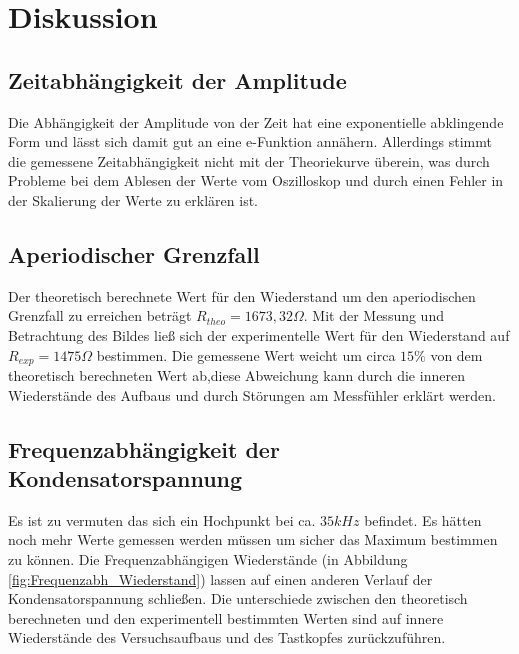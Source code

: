 \newpage
\section{Diskussion}
\label{sec:Diskussion}
\subsection{Zeitabhängigkeit der Amplitude}
Die Abhängigkeit der Amplitude von der Zeit hat eine exponentielle abklingende Form und lässt sich damit gut an eine e-Funktion annähern.
Allerdings stimmt die gemessene Zeitabhängigkeit nicht mit der Theoriekurve überein, was durch Probleme bei dem Ablesen der Werte vom Oszilloskop
und durch einen Fehler in der Skalierung der Werte zu erklären ist.
\subsection{Aperiodischer Grenzfall}
Der theoretisch berechnete Wert für den Wiederstand um den aperiodischen Grenzfall zu erreichen beträgt $R_{theo}=1673,32 \Omega$.
Mit der Messung und Betrachtung des Bildes ließ sich der experimentelle Wert für den Wiederstand auf $R_{exp} = 1475\Omega$ bestimmen.
Die gemessene Wert weicht um circa $15\%$ von dem theoretisch berechneten Wert ab,diese Abweichung kann durch die inneren Wiederstände des Aufbaus und durch Störungen am Messfühler erklärt werden.

\subsection{Frequenzabhängigkeit der Kondensatorspannung}
Es ist zu vermuten das sich ein Hochpunkt bei ca. $35kHz$ befindet.
Es hätten noch mehr Werte gemessen werden müssen um sicher das Maximum bestimmen zu können.
Die Frequenzabhängigen Wiederstände (in Abbildung \ref{fig:Frequenzabh_Wiederstand}) lassen auf einen anderen Verlauf der Kondensatorspannung schließen.
Die unterschiede zwischen den theoretisch berechneten und den experimentell bestimmten Werten sind auf innere Wiederstände des Versuchsaufbaus und des Tastkopfes zurückzuführen.